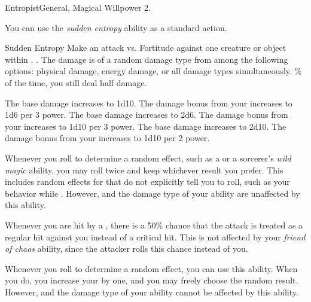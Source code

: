     \begin{magicalfeat}{Entropist}{General, Magical}
        \featpre Willpower 2.

         You can use the \textit{sudden entropy} ability as a standard action.
        \begin{magicalactiveability}{Sudden Entropy}
            \rankline
            Make an attack vs. Fortitude against one creature or object within \shortrange.
            \hit \damageranktwo{}.
            The damage is of a random damage type from among the following options: physical damage, energy damage, or all damage types simultaneously.
            \% of the time, you still deal half damage.

            \rankline
             The base damage increases to 1d10.
             The damage bonus from your  increases to 1d6 per 3 power.
             The base damage increases to 2d6.
             The damage bonus from your  increases to 1d10 per 3 power.
             The base damage increases to 2d10.
             The damage bonus from your  increases to 1d10 per 2 power.
        \end{magicalactiveability}

         Whenever you roll to determine a random effect, such as a  or a sorcerer's \textit{wild magic} ability, you may roll twice and keep whichever result you prefer.
        This includes random effects for that do not explicitly tell you to roll, such as your behavior while \confused.
        However,  and the damage type of your  ability are unaffected by this ability.

         Whenever you are hit by a , there is a 50\% chance that the attack is treated as a regular hit against you instead of a critical hit.
        This is not affected by your \textit{friend of chaos} ability, since the attacker rolls this chance instead of you.

         Whenever you roll to determine a random effect, you can use this ability.
        When you do, you increase your  by one, and you may freely choose the random result.
        However,  and the damage type of your  ability cannot be affected by this ability.
    \end{magicalfeat}

